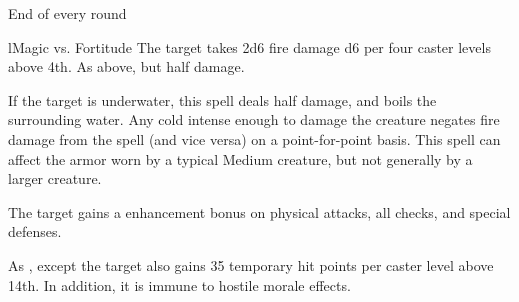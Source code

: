 \begin{spellheader}
    \spellrng{\rngmed}
    \spelldur{\durshort \dismissable}
\end{spellheader}
\begin{spelleffects}
    \begin{spelltrigger}{End of every round}
        \begin{spellattack}l{Magic vs. Fortitude}
            \spellsuccess The target takes 2d6 fire damage \add d6 per four caster levels above 4th.
            \spellfailure As above, but half damage.
        \end{spellattack}
    \end{spelltrigger}
\end{spelleffects}
\begin{spellfooter}
    \spellnotes If the target is underwater, this spell deals half damage, and boils the surrounding water. Any cold intense enough to damage the creature negates fire damage from the spell (and vice versa) on a point-for-point basis. This spell can affect the armor worn by a typical Medium creature, but not generally by a larger creature.
\end{spellfooter}

\begin{spellheader}
    \spellrng{\rngclose}
    \spelldur{\durshort \dismissable}
\end{spellheader}
\begin{spelleffects}
    \spelleffect The target gains a  enhancement bonus on physical attacks, all checks, and special defenses. \spellbonusscalingdescription
\end{spelleffects}
\begin{spellfooter}

\end{spellfooter}

\begin{spellheader}
    \spellrng{\rngclose}
    \spelldur{\durshort \dismissable}
\end{spellheader}
\begin{spelleffects}
    \spelleffect As , except the target also gains 35 temporary hit points  per caster level above 14th. In addition, it is immune to hostile morale effects.
\end{spelleffects}
\begin{spellfooter}

\end{spellfooter}


